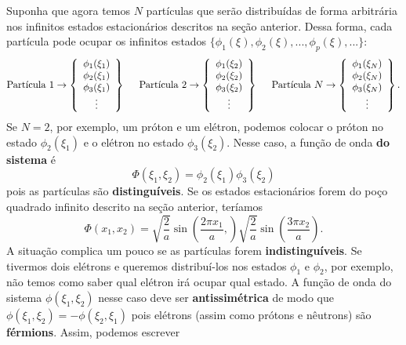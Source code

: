 \documentclass{article}
\begin{document}
Suponha que agora temos $N$ partículas que serão distribuídas de forma arbitrária nos infinitos estados estacionários descritos na seção anterior. Dessa forma, cada partícula pode ocupar os infinitos estados $\{ \phi_1(\xi), \phi_2(\xi),...,\phi_p(\xi),... \}$:
\begin{equation}
\text{Partícula 1} \rightarrow 
\left\{
  \begin{array}{c}
    \phi_1(\xi_1)\\
    \phi_2(\xi_1)\\
    \phi_3(\xi_1)\\
    \vdots
  \end{array}
\right\}
\hspace{0.5cm}
\text{Partícula 2} \rightarrow 
\left\{
  \begin{array}{c}
    \phi_1(\xi_2)\\
    \phi_2(\xi_2)\\
    \phi_3(\xi_2)\\
    \vdots
  \end{array}
\right\}
\hspace{0.5cm}
\text{Partícula }N \rightarrow 
\left\{
  \begin{array}{c}
    \phi_1(\xi_N)\\
    \phi_2(\xi_N)\\
    \phi_3(\xi_N)\\
    \vdots
  \end{array}
\right\}.
\end{equation}
Se $N = 2$, por exemplo, um próton e um elétron, podemos colocar o próton no estado $\phi_2(\xi_1)$ e o elétron no estado $\phi_3(\xi_2)$. Nesse caso, a função de onda \textbf{do sistema} é
\begin{equation}
    \Phi(\xi_1,\xi_2) = \phi_2(\xi_1) \phi_3(\xi_2)
\end{equation}
pois as partículas são \textbf{distinguíveis}. Se os estados estacionários forem do poço quadrado infinito descrito na seção anterior, teríamos
\begin{equation}
    \Phi(x_1,x_2) = \sqrt{\frac{2}{a}}\sin \left(  \frac{2\pi x_1}{a}  ,  \right)\sqrt{\frac{2}{a}}\sin \left(  \frac{3\pi x_2}{a}  \right).
\end{equation}
A situação complica um pouco se as partículas forem \textbf{indistinguíveis}. Se tivermos dois elétrons e queremos distribuí-los nos estados $\phi_1$ e $\phi_2$, por exemplo, não temos como saber qual elétron irá ocupar qual estado. A função de onda do sistema $\phi(\xi_1,\xi_2)$ nesse caso deve ser \textbf{antissimétrica} de modo que $\phi(\xi_1,\xi_2) = -\phi(\xi_2,\xi_1)$ pois elétrons (assim como prótons e nêutrons) são \textbf{férmions}. Assim, podemos escrever
\end{document}
